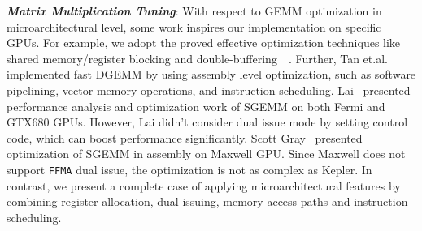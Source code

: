{\em {\bf Matrix Multiplication Tuning}}: With respect to GEMM optimization in microarchitectural level, some work inspires our implementation 
on specific GPUs. For example, we adopt the proved effective optimization techniques like shared memory/register 
blocking and double-buffering~\cite{volkov}~\cite{tan}. Further, Tan et.al.~\cite{tan} implemented fast DGEMM by using 
assembly level optimization, such as software pipelining, vector memory operations, and instruction scheduling. 
Lai~\cite{lai} presented performance analysis and optimization work of SGEMM on both Fermi and GTX680 GPUs. However, 
Lai didn't consider dual issue mode by setting control code, which can boost performance significantly. Scott 
Gray~\cite{nervana_sgemm_wiki} presented optimization of SGEMM in assembly on Maxwell GPU. Since Maxwell does not 
support {\tt FFMA} dual issue, the optimization is not as complex as 
Kepler. In contrast, we present a complete case of applying microarchitectural features by combining 
register allocation, dual issuing, memory access paths and instruction scheduling.
